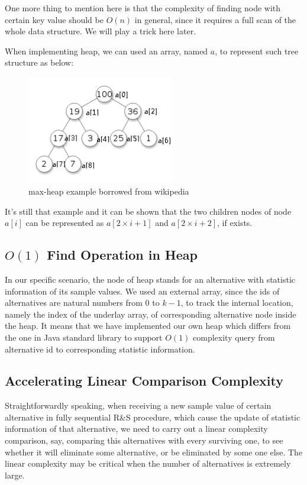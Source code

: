 One more thing to mention here is that the complexity of finding node with certain key value should be $O(n)$ in general, since it requires a full scan of the whole data structure. We will play a trick here later.

When implementing heap, we can used an array, named $a$, to represent such tree structure as below:

\begin{figure}[ht]
\centering
\includegraphics[width=64mm]{heap2.png}
\caption{max-heap example borrowed from wikipedia}
\end{figure}

It's still that example and it can be shown that the two children nodes of node $a[i]$ can be represented as $a[2 \times i + 1]$ and $a[2 \times i + 2]$, if exists.

\subsection{$O(1)$ Find Operation in Heap}

In our specific scenario, the node of heap stands for an alternative with statistic information of its sample values. We used an external array, since the ids of alternatives are natural numbers from $0$ to $k - 1$, to track the internal location, namely the index of the underlay array, of corresponding alternative node inside the heap. It means that we have implemented our own heap which differs from the one in Java standard library to support $O(1)$ complexity query from alternative id to corresponding statistic information.

\subsection{Accelerating Linear Comparison Complexity}

Straightforwardly speaking, when receiving a new sample value of certain alternative in fully sequential R\&S procedure, which cause the update of statistic information of that alternative, we need to carry out a linear complexity comparison, say, comparing this alternatives with every surviving one, to see whether it will eliminate some alternative, or be eliminated by some one else. The linear complexity may be critical when the number of alternatives is extremely large.

